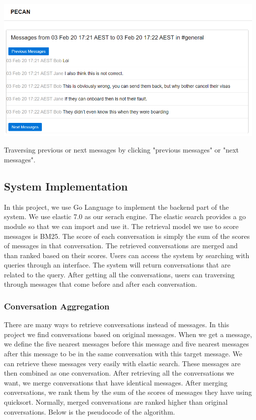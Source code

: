 \includegraphics[scale=0.2]{traversing}

Traversing previous or next messages by clicking "previous messages" or "next messages".
\bigbreak

\subsection{System Implementation}
In this project, we use Go Language to implement the backend part of the system. We use elastic 7.0 as our serach engine. The elastic search provides a go module so that we can import and use it. The retrieval model we use to score messages is BM25. The score of each conversation is simply the sum of the scores of messages in that conversation. The retrieved conversations are merged and than ranked based on their scores. Users can access the system by searching with queries through an interface. The system will return conversations that are related to the query. After getting all the conversations, users can traversing through messages that come before and after each conversation.

\subsubsection{Conversation Aggregation}
There are many ways to retrieve conversations instead of messages. In this project we find conversations based on original messages. When we get a message, we define the five nearest messages before this message and five nearest messages after this message to be in the same conversation with this target message. We can retrieve these messages very easily with elastic search. These messages are then combined as one conversation. After retrieving all the conversations we want, we merge conversations that have identical messages. After merging conversations, we rank them by the sum of the scores of messages they have using quicksort. Normally, merged conversations are ranked higher than original conversations. Below is the pseudocode of the algorithm.

